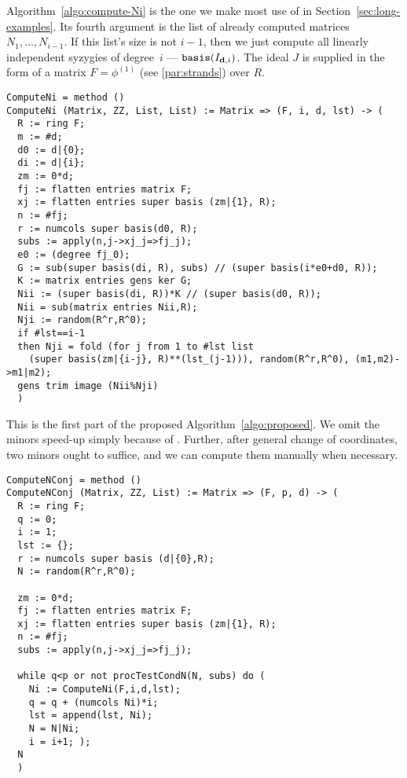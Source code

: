 \documentclass[fleqn,reqno]{amsart}
\numberwithin{first}{chapter}
\begin{document}
\begin{code}
\label{code:algo:compute-Ni}
Algorithm~\ref{algo:compute-Ni} is the one we make most use of in Section~\ref{sec:long-examples}.
Its fourth argument is the list of already computed matrices $N_1,\ldots,N_{i-1}$.
If this list's size is not $i-1$,
then we just compute all linearly independent syzygies of degree~$i$ --- $\mathop{\tt basis}(I_{\mathbf d,i})$.
The ideal $J$ is supplied in the form of a matrix $F=\phi^{(1)}$ (see \ref{par:strands}) over $R$.
\begin{verbatim}
ComputeNi = method ()
ComputeNi (Matrix, ZZ, List, List) := Matrix => (F, i, d, lst) -> (
  R := ring F;
  m := #d;
  d0 := d|{0};
  di := d|{i};
  zm := 0*d;
  fj := flatten entries matrix F;
  xj := flatten entries super basis (zm|{1}, R);
  n := #fj;
  r := numcols super basis(d0, R);
  subs := apply(n,j->xj_j=>fj_j);
  e0 := (degree fj_0);
  G := sub(super basis(di, R), subs) // (super basis(i*e0+d0, R));
  K := matrix entries gens ker G;
  Nii := (super basis(di, R))*K // (super basis(d0, R));
  Nii = sub(matrix entries Nii,R);
  Nji := random(R^r,R^0);
  if #lst==i-1
  then Nji = fold (for j from 1 to #lst list
    (super basis(zm|{i-j}, R)**(lst_(j-1))), random(R^r,R^0), (m1,m2)->m1|m2);
  gens trim image (Nii%Nji)
  )
\end{verbatim}
\end{code}

\begin{code}
\label{code:algo:proposed}
This is the first part of the proposed Algorithm~\ref{algo:proposed}.
We omit the minors speed-up simply because of .
Further, after general change of coordinates, two minors ought to suffice,
and we can compute them manually when necessary.
\begin{verbatim}
ComputeNConj = method ()
ComputeNConj (Matrix, ZZ, List) := Matrix => (F, p, d) -> (
  R := ring F;
  q := 0;
  i := 1;
  lst := {};
  r := numcols super basis (d|{0},R);
  N := random(R^r,R^0);
  
  zm := 0*d;
  fj := flatten entries matrix F;
  xj := flatten entries super basis (zm|{1}, R);
  n := #fj;
  subs := apply(n,j->xj_j=>fj_j);
  
  while q<p or not procTestCondN(N, subs) do (
    Ni := ComputeNi(F,i,d,lst);
    q = q + (numcols Ni)*i;
    lst = append(lst, Ni);
    N = N|Ni;
    i = i+1; );
  N
  )
\end{verbatim}
\end{code}
\end{document}
